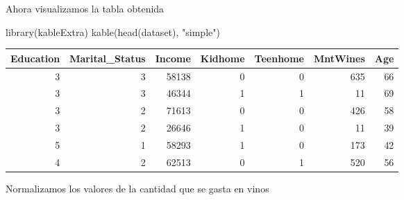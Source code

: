 \documentclass[Iberoamerican Journal of Industrial
Engineering,article,submit,moreauthors,pdftex]{Definitions/mdpi}
\newenvironment{Shaded}{\begin{snugshade}}{\end{snugshade}}
\newcommand{\AttributeTok}[1]{\textcolor[rgb]{0.77,0.63,0.00}{#1}}
\newcommand{\ControlFlowTok}[1]{\textcolor[rgb]{0.13,0.29,0.53}{\textbf{#1}}}
\newcommand{\FunctionTok}[1]{\textcolor[rgb]{0.00,0.00,0.00}{#1}}
\newcommand{\NormalTok}[1]{#1}
\newcommand{\OtherTok}[1]{\textcolor[rgb]{0.56,0.35,0.01}{#1}}
\newcommand{\SpecialCharTok}[1]{\textcolor[rgb]{0.00,0.00,0.00}{#1}}
\newcommand{\StringTok}[1]{\textcolor[rgb]{0.31,0.60,0.02}{#1}}
\begin{document}
\begin{Shaded}
\end{Shaded}

Ahora visualizamos la tabla obtenida

\begin{Shaded}
\begin{Highlighting}[]
\FunctionTok{library}\NormalTok{(kableExtra)}
\FunctionTok{kable}\NormalTok{(}\FunctionTok{head}\NormalTok{(dataset), }\StringTok{"simple"}\NormalTok{)}
\end{Highlighting}
\end{Shaded}

\begin{longtable}[]{@{}rrrrrrr@{}}
\toprule()
Education & Marital\_Status & Income & Kidhome & Teenhome & MntWines &
Age \\
\midrule()
\endhead
3 & 3 & 58138 & 0 & 0 & 635 & 66 \\
3 & 3 & 46344 & 1 & 1 & 11 & 69 \\
3 & 2 & 71613 & 0 & 0 & 426 & 58 \\
3 & 2 & 26646 & 1 & 0 & 11 & 39 \\
5 & 1 & 58293 & 1 & 0 & 173 & 42 \\
4 & 2 & 62513 & 0 & 1 & 520 & 56 \\
\bottomrule()
\end{longtable}

Normalizamos los valores de la cantidad que se gasta en vinos

\begin{Shaded}
\end{Shaded}
\end{document}
